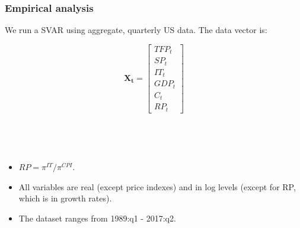 \documentclass{beamer}
\begin{document}
\begin{frame}
	\frametitle{Empirical analysis}

	We run a SVAR using aggregate, quarterly US data. The data vector is:
	
	\begin{equation}
	\mathbf{X_t} = 
	\begin{bmatrix}
    TFP_t      \\
 
   SP_t   \\
   
   IT_t \\
   
   GDP_t \\
   
   C_t \\
   
   RP_t
\end{bmatrix}
	\end{equation}
	


\

\

\begin{itemize}
\item $RP = \pi^{IT}/\pi^{CPI}$. 
\item All variables are real (except price indexes) and in log levels (except for RP, which is in growth rates). 
\item The dataset ranges from 1989:q1 - 2017:q2.
\end{itemize}	
	
\end{frame}
\end{document}
